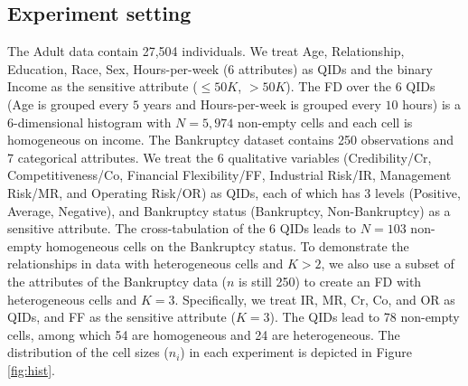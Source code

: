 \documentclass[10pt,journal,compsoc]{IEEEtran}
\begin{document}
\vspace{-9pt}\subsection{Experiment setting}\label{sec:setting}\vspace{-4pt}
The Adult data contain 27,504 individuals. We treat Age, Relationship, Education, Race, Sex, Hours-per-week (6 attributes) as QIDs and the binary Income as the sensitive attribute ($\le\!50K$, $>\!50K$). The FD over the 6 QIDs (Age is grouped every $5$ years and Hours-per-week is grouped every $10$ hours) is a 6-dimensional histogram with $N\!=\!5,974$ non-empty cells and each cell is homogeneous on income.   The Bankruptcy dataset contains 250 observations and 7 categorical attributes. We treat the 6 qualitative variables (Credibility/Cr, Competitiveness/Co, Financial Flexibility/FF, Industrial Risk/IR, Management Risk/MR, and Operating Risk/OR) as QIDs, each of which has 3 levels (Positive, Average, Negative), and Bankruptcy status (Bankruptcy, Non-Bankruptcy) as a sensitive attribute. The cross-tabulation of the 6 QIDs leads to $N\!=\!103$ non-empty homogeneous cells on the Bankruptcy status.  To demonstrate the relationships in data with heterogeneous cells and $K\!>\!2$, we also use a subset of the attributes of the Bankruptcy data ($n$ is still 250) to create an FD with heterogeneous cells and $K\!=\!3$. Specifically, we treat IR, MR, Cr, Co, and OR as QIDs, and FF as the sensitive attribute ($K\!=\!3$). The QIDs lead to 78 non-empty cells, among which 54 are homogeneous and 24 are heterogeneous. The distribution of the cell sizes  ($n_i$) in each experiment is depicted in Figure \ref{fig:hist}.
\end{document}

